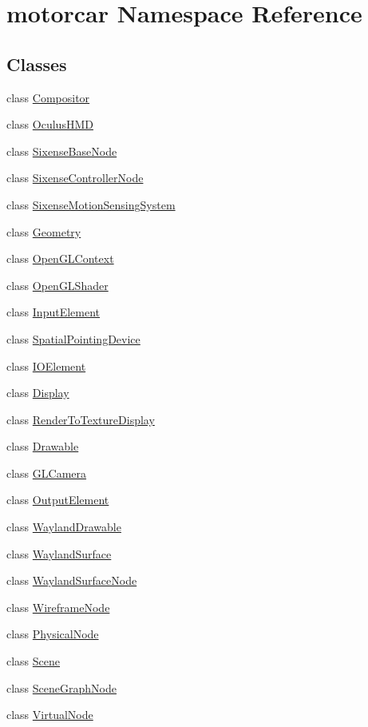 \hypertarget{namespacemotorcar}{\section{motorcar Namespace Reference}
\label{namespacemotorcar}
}
\subsection*{Classes}
\begin{DoxyCompactItemize}
\item 
class \hyperlink{classmotorcar_1_1Compositor}{Compositor}
\item 
class \hyperlink{classmotorcar_1_1OculusHMD}{Oculus\-H\-M\-D}
\item 
class \hyperlink{classmotorcar_1_1SixenseBaseNode}{Sixense\-Base\-Node}
\item 
class \hyperlink{classmotorcar_1_1SixenseControllerNode}{Sixense\-Controller\-Node}
\item 
class \hyperlink{classmotorcar_1_1SixenseMotionSensingSystem}{Sixense\-Motion\-Sensing\-System}
\item 
class \hyperlink{classmotorcar_1_1Geometry}{Geometry}
\item 
class \hyperlink{classmotorcar_1_1OpenGLContext}{Open\-G\-L\-Context}
\item 
class \hyperlink{classmotorcar_1_1OpenGLShader}{Open\-G\-L\-Shader}
\item 
class \hyperlink{classmotorcar_1_1InputElement}{Input\-Element}
\item 
class \hyperlink{classmotorcar_1_1SpatialPointingDevice}{Spatial\-Pointing\-Device}
\item 
class \hyperlink{classmotorcar_1_1IOElement}{I\-O\-Element}
\item 
class \hyperlink{classmotorcar_1_1Display}{Display}
\item 
class \hyperlink{classmotorcar_1_1RenderToTextureDisplay}{Render\-To\-Texture\-Display}
\item 
class \hyperlink{classmotorcar_1_1Drawable}{Drawable}
\item 
class \hyperlink{classmotorcar_1_1GLCamera}{G\-L\-Camera}
\item 
class \hyperlink{classmotorcar_1_1OutputElement}{Output\-Element}
\item 
class \hyperlink{classmotorcar_1_1WaylandDrawable}{Wayland\-Drawable}
\item 
class \hyperlink{classmotorcar_1_1WaylandSurface}{Wayland\-Surface}
\item 
class \hyperlink{classmotorcar_1_1WaylandSurfaceNode}{Wayland\-Surface\-Node}
\item 
class \hyperlink{classmotorcar_1_1WireframeNode}{Wireframe\-Node}
\item 
class \hyperlink{classmotorcar_1_1PhysicalNode}{Physical\-Node}
\item 
class \hyperlink{classmotorcar_1_1Scene}{Scene}
\item 
class \hyperlink{classmotorcar_1_1SceneGraphNode}{Scene\-Graph\-Node}
\item 
class \hyperlink{classmotorcar_1_1VirtualNode}{Virtual\-Node}
\end{DoxyCompactItemize}
